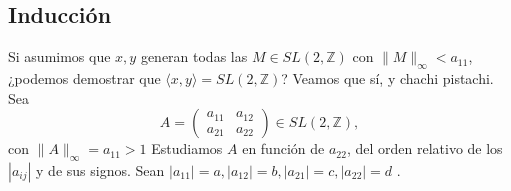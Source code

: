 \documentclass{article}
\newcommand\tab[1][0.6cm]{\hspace*{#1}}
\newcommand\nl{\newline\tab}
\begin{document}
	\subsection{Inducción }
	\tab Si asumimos que $x, y$ generan todas las $M \in SL(2, \mathbb{Z}) $ con  $ \| M \|_\infty < a_{11} $, ¿podemos demostrar que $\langle x, y \rangle =  SL(2, \mathbb{Z})$? 
	Veamos que sí, y chachi pistachi. 
	Sea $$
	A = 
	\begin{pmatrix}
	a_{11} & a_{12} \\
	a_{21} & a_{22} 
	\end{pmatrix} \in SL(2, \mathbb{Z}), $$ con  $ \| A \|_\infty = a_{11} > 1
	$ \nl 
	Estudiamos $A$ en función de $a_{22}$, del orden relativo de los $|a_{ij}|$ y de sus signos.\nl
	Sean $|a_{11}| = a, |a_{12}| = b, |a_{21}| = c, |a_{22}| = d $	.
\end{document}
